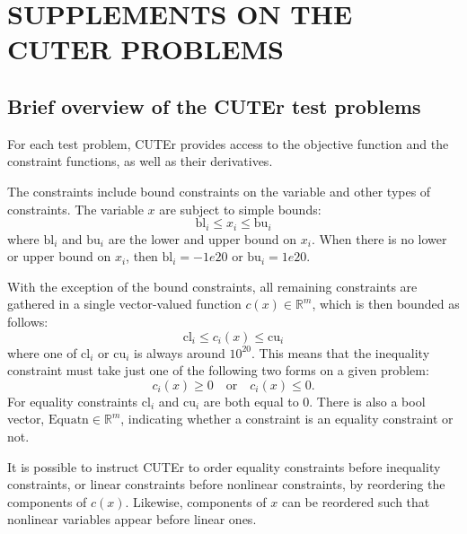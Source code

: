 \chapter{SUPPLEMENTS ON THE CUTER PROBLEMS}

\section{Brief overview of the CUTEr test problems}\label{sec:cuternm}
For each test problem, CUTEr provides access to the objective function and the constraint functions, as well as their derivatives.

The constraints include bound constraints on the variable and other types of constraints. The variable $x$ are subject to simple bounds:
\begin{equation*}
\text{bl}_i \leq x_i \leq \text{bu}_i  
\end{equation*}
where $\text{bl}_i$ and $\text{bu}_i$ are the lower and upper bound on $x_i$. When there is no lower or upper bound on $x_i$, then $\text{bl}_i = -1e20$ or $\text{bu}_i = 1e20$. 

With the exception of the bound constraints, all remaining 
constraints are gathered in a single vector-valued function $c(x) \in \mathbb{R}^m$, which is then bounded as follows:   
\begin{equation*}
\text{cl}_i \leq c_i(x) \leq \text{cu}_i  
\end{equation*}
where one of $\text{cl}_i$ or $\text{cu}_i$ is always around $10^{20}$. This means that the inequality constraint must take just one of 
the following two forms on a given problem:
\begin{equation*}
c_i(x) \geq 0   \quad  \text{or}  \quad  c_i(x) \leq 0.
\end{equation*}
For equality constraints $\text{cl}_i$ and $\text{cu}_i$ are both equal to 0. There is also a bool vector, $\text{Equatn} \in \mathbb{R}^m$, indicating whether a constraint is an equality constraint or not. 

It is possible to instruct CUTEr to order equality constraints before inequality constraints, or linear constraints before nonlinear constraints, by reordering the components of $c(x)$. Likewise, components of $x$ can be reordered such that nonlinear variables appear before linear ones. 


